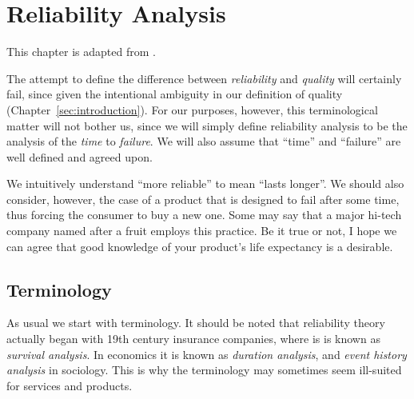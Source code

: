 \chapter{Reliability Analysis}

This chapter is adapted from \cite{natrella_nist/sematech_2010}.



The attempt to define the difference between \emph{reliability} and \emph{quality} will certainly fail, since given the intentional ambiguity in our definition of quality (Chapter~\ref{sec:introduction}).
For our purposes, however, this terminological matter will not bother us, since we will simply define reliability analysis to be the analysis of the \emph{time} to \emph{failure}.
We will also assume that ``time'' and ``failure'' are well defined and agreed upon.

We intuitively understand ``more reliable'' to mean ``lasts longer''. 
We should also consider, however, the case of a product that is designed to fail after some time, thus forcing the consumer to buy a new one. 
Some may say that a major hi-tech company named after a fruit employs this practice. 
Be it true or not, I hope we can agree that good knowledge of your product's life expectancy is a desirable. 









\section{Terminology}
As usual we start with terminology.
It should be noted that reliability theory actually began with 19th century insurance companies, where is is known as \emph{survival analysis}.
In economics it is known as \emph{duration analysis}, and \emph{event history analysis} in sociology. 
This is why the terminology may sometimes seem ill-suited for services and products. 
